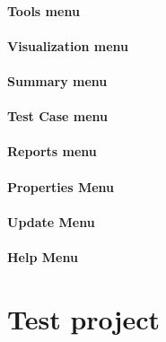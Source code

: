 \documentclass[utf8, english, usepdftitle=false, svgnames, color="table, fixpdftex,  fixinclude, xcdraw", t]{beamer}
\begin{document}
\subsection{Tools menu}


\subsection{Visualization menu}


\subsection{Summary menu}


\subsection{Test Case menu}


\subsection{Reports menu}


\subsection{Properties Menu}


\subsection{Update Menu}


\subsection{Help Menu}


%
%

%
\part{Test project}
\end{document}
